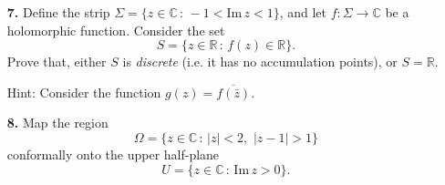 \documentclass[12pt]{article}
\newcommand{\C}{\mathbb{C} }
\begin{document}
\begin{itemize}
\item[{\bf 7.}] Define the
strip
$\Sigma=\{z\in\C\,:\,-1<\text{Im}\,z<1\}$, and
let $f:\Sigma\to\C$ be a holomorphic function. Consider the set
$$
S=\{z\in\mathbb{R}\,:\,f(z)\in\mathbb{R}\}.$$
Prove that, either $S$ is {\em discrete\/} (i.e. it has no accumulation points),
or $S=\mathbb{R}$.

{\footnotesize
{\sc Hint:} Consider the function $g(z)=\overline{f(\bar{z})}$.
}

\item[{\bf 8.}]
Map the region
$$
\Omega=\{z\in\mathbb{C}\,:\,|z|<2,\,\,|z-1|>1\}$$
conformally onto the upper half-plane
$$
U=\{z\in\mathbb{C}\,:\,\text{Im}\,z>0\}.$$

\end{itemize}
\end{document}
